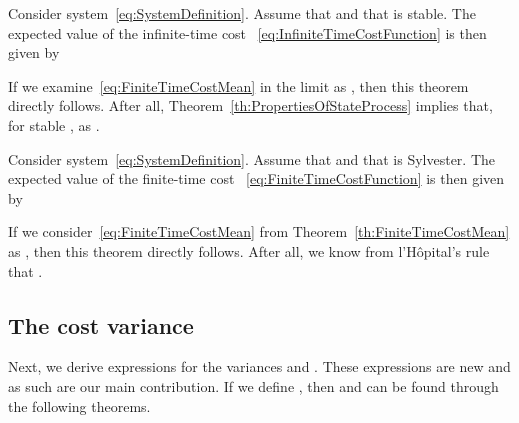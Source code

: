 \documentclass[twocolumn]{autart}
\begin{document}
\begin{thm}\label{th:InfiniteTimeCostMean}
Consider system~\eqref{eq:SystemDefinition}. Assume that  and that  is stable. The expected value  of the infinite-time cost ~\eqref{eq:InfiniteTimeCostFunction} is then given by

\end{thm}
\begin{pf}
If we examine~\eqref{eq:FiniteTimeCostMean} in the limit as , then this theorem directly follows. After all, Theorem~\ref{th:PropertiesOfStateProcess} implies that, for stable ,  as .
\end{pf}

\begin{thm}\label{th:FiniteTimeCostMeanWithAlphaZero}
Consider system~\eqref{eq:SystemDefinition}. Assume that  and that  is Sylvester. The expected value  of the finite-time cost ~\eqref{eq:FiniteTimeCostFunction} is then given by

\end{thm}
\begin{pf}
If we consider~\eqref{eq:FiniteTimeCostMean} from Theorem~\ref{th:FiniteTimeCostMean} as , then this theorem directly follows. After all, we know from l'H\^opital's rule that .
\end{pf}

\subsection{The cost variance}

Next, we derive expressions for the variances  and . These expressions are new and as such are our main contribution. If we define , then  and  can be found through the following theorems.
\end{document}
